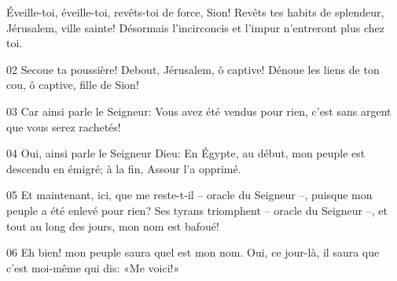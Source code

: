 Éveille-toi, éveille-toi, revêts-toi de force, Sion! Revêts tes habits de splendeur, Jérusalem, ville sainte! Désormais l’incirconcis et l’impur n’entreront plus chez toi.

02 Secoue ta poussière! Debout, Jérusalem, ô captive! Dénoue les liens de ton cou, ô captive, fille de Sion!

03 Car ainsi parle le Seigneur: Vous avez été vendus pour rien, c’est sans argent que vous serez rachetés!

04 Oui, ainsi parle le Seigneur Dieu: En Égypte, au début, mon peuple est descendu en émigré; à la fin, Assour l’a opprimé.

05 Et maintenant, ici, que me reste-t-il – oracle du Seigneur –, puisque mon peuple a été enlevé pour rien? Ses tyrans triomphent – oracle du Seigneur –, et tout au long des jours, mon nom est bafoué!

06 Eh bien! mon peuple saura quel est mon nom. Oui, ce jour-là, il saura que c’est moi-même qui dis: «Me voici!»